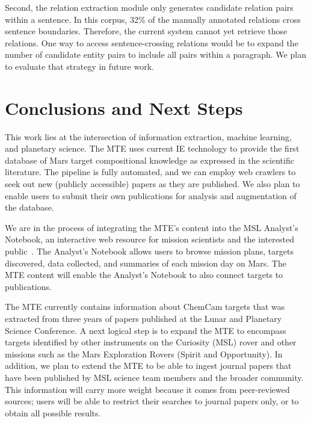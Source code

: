 \documentclass[letterpaper]{article} %
\begin{document}
Second, the relation extraction module only generates candidate
relation pairs within a sentence.  In this corpus, 32\% of the
manually annotated relations cross sentence boundaries.  Therefore,
the current system cannot yet retrieve those relations.  
%
One way to access sentence-crossing relations would be to expand the
number of candidate entity pairs to include all pairs within a
paragraph.  We plan to evaluate that strategy in future work.


\section{Conclusions and Next Steps}

This work lies at the intersection of information extraction, machine
learning, and planetary science.  The MTE uses current IE technology
to provide the first database of Mars target compositional knowledge
as expressed in the scientific literature.  The pipeline is fully
automated, and we can employ web crawlers to seek out new (publicly
accessible) papers as they are published.  We also plan to enable
users to submit their own publications for analysis and augmentation
of the database.

We are in the process of integrating the MTE's content into the MSL
Analyst's Notebook, an interactive web resource for mission scientists
and the interested public~\cite{stein:msl-an13}.  The Analyst's
Notebook allows users to 
browse mission plans, targets discovered, data collected, and
summaries of each mission day on Mars.  The MTE content will enable
the Analyst's Notebook to also connect targets to publications.

The MTE currently contains information about ChemCam targets that was
extracted from three years of papers published at the Lunar and
Planetary Science Conference.  A next logical step is to expand the
MTE to encompass targets identified by other instruments on the
Curiosity (MSL) rover and other missions such as the Mars Exploration
Rovers (Spirit and Opportunity).  In addition, we plan to extend the
MTE to be able to ingest journal papers that have been published by
MSL science team members and the broader community.  This information
will carry more weight because it comes from peer-reviewed sources; users
will be able to restrict their searches to journal papers only, or to
obtain all possible results.
\end{document}
